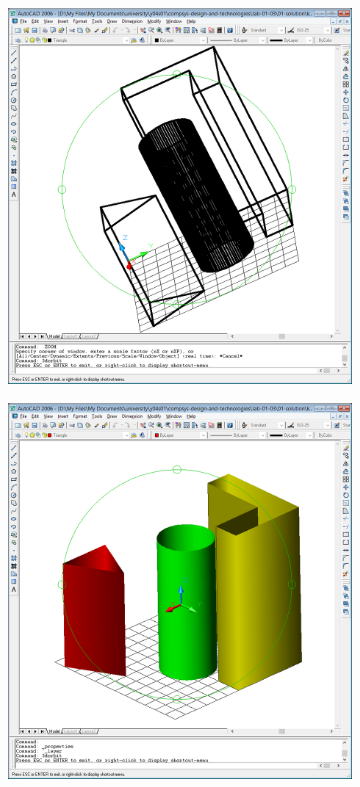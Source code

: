 \documentclass[
	a4paper,
	oneside,
	BCOR = 10mm,
	DIV = 12,
	12pt,
	headings = normal,
]{scrartcl}
\newlength{\gridunitwidth}
\begin{document}
			\begin{figure}[!htbp]
				\begin{subfigure}[b]{6 \gridunitwidth - (1em / 2)}
					\includegraphics[width = \columnwidth]{./assets/p15.png}
					\caption{}
					\label{subfig:06-dynamic-rotation-01}
				\end{subfigure}%
				\hspace{1em}%
				\begin{subfigure}[b]{6 \gridunitwidth - (1em / 2)}
					\centering
					\includegraphics[width = \columnwidth]{./assets/p16.png}

\end{subfigure}
\end{figure}
\end{document}
